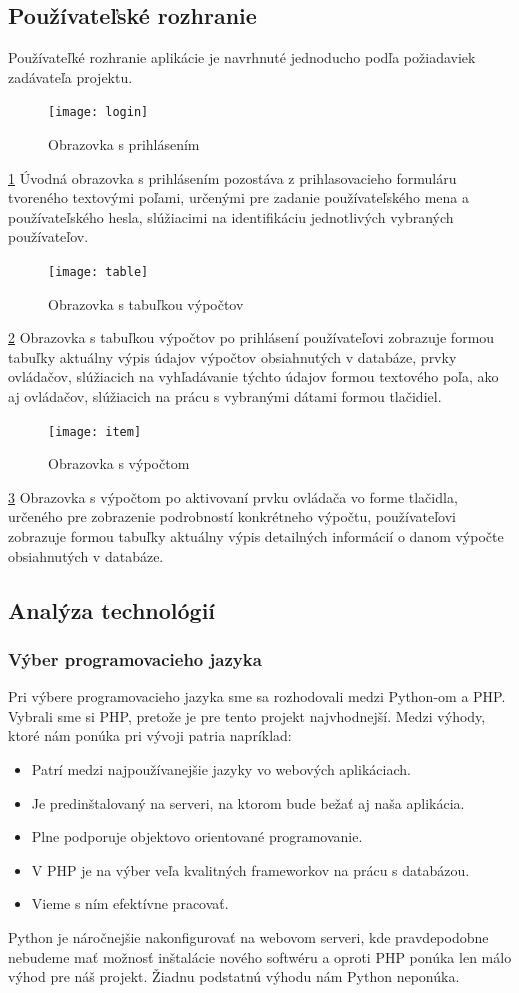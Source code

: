 \documentclass[12pt,a4paper]{article}
\begin{document}
\subsection{Používateľské rozhranie}
Používateľké rozhranie aplikácie je navrhnuté jednoducho podľa požiadaviek zadávateľa projektu.
\begin{figure}[H]
	\caption{Obrazovka s prihlásením}
	\texttt{[image: login]}
	\label{fig:ui1}
\end{figure}
\ref{fig:ui1}
Úvodná obrazovka s prihlásením pozostáva z prihlasovacieho formuláru tvoreného textovými poľami, určenými pre zadanie používateľského mena a používateľského hesla, slúžiacimi na identifikáciu jednotlivých vybraných používateľov.
\begin{figure}[H]
	\caption{Obrazovka s tabuľkou výpočtov}
	\texttt{[image: table]}
	\label{fig:ui2}
\end{figure}
\ref{fig:ui2}
Obrazovka s tabuľkou výpočtov po prihlásení používateľovi zobrazuje formou tabuľky aktuálny výpis údajov výpočtov obsiahnutých v databáze, prvky ovládačov, slúžiacich na vyhľadávanie týchto údajov formou textového poľa, ako aj ovládačov, slúžiacich na prácu s vybranými dátami formou tlačidiel.
\begin{figure}[H]
	\caption{Obrazovka s výpočtom}
	\texttt{[image: item]}
	\label{fig:ui3}
\end{figure}
\ref{fig:ui3}
Obrazovka s výpočtom po aktivovaní prvku ovládača vo forme tlačidla, určeného pre zobrazenie podrobností konkrétneho výpočtu, používateľovi zobrazuje formou tabuľky aktuálny výpis detailných informácií o danom výpočte obsiahnutých v databáze.

\subsection{Analýza technológií}

\subsubsection{Výber programovacieho jazyka}
Pri výbere programovacieho jazyka sme sa rozhodovali medzi Python-om a PHP. Vybrali sme si PHP, pretože je pre tento projekt najvhodnejší. Medzi výhody, ktoré nám ponúka pri vývoji patria napríklad:
\begin{itemize}
	\item Patrí medzi najpoužívanejšie jazyky vo webových aplikáciach.
	\item Je predinštalovaný na serveri, na ktorom bude bežať aj naša aplikácia.
	\item Plne podporuje objektovo orientované programovanie.
	\item V PHP je na výber veľa kvalitných frameworkov na prácu s databázou.
	\item Vieme s ním efektívne pracovať.
\end{itemize}
Python je náročnejšie nakonfigurovať na webovom serveri, kde pravdepodobne nebudeme mať možnosť inštalácie nového softwéru a oproti PHP ponúka len málo výhod pre náš projekt. Žiadnu podstatnú výhodu nám Python neponúka.
\end{document}
